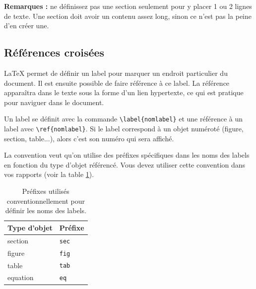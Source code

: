 \documentclass{ASD}
\begin{document}
\textbf{Remarques :} ne définissez pas une section seulement pour y placer 1 ou 2 lignes de texte. Une section doit avoir un contenu assez long, sinon ce n'est pas la peine d'en créer une.
	
\subsection{Références croisées}
\label{sec:references}
\LaTeX{} permet de définir un label pour marquer un endroit particulier du document. Il est ensuite possible de faire référence à ce label. La référence apparaîtra dans le texte sous la forme d'un lien hypertexte, ce qui est pratique pour naviguer dans le document. 
	
Un label se définit avec la commande \texttt{\textbackslash{}label\{nomlabel\}} et une référence à un label avec \texttt{\textbackslash{}ref\{nomlabel\}}. Si le label correspond à un objet numéroté (figure, section, table...), alors c'est son numéro qui sera affiché.
	
La convention veut qu'on utilise des préfixes spécifiques dans les noms des labels en fonction du type d'objet référencé. Vous devez utiliser cette convention dans vos rapports (voir la table \ref{tab:prefixes}).
	
\begin{table}[htb]
	\centering
	\begin{tabular}{l l}
		\hline
		\rowcolor{DarkColor} 
		\textbf{Type d'objet}	& \textbf{Préfixe}	\\
		\hline
		section					& \texttt{sec}	\\
		figure 					& \texttt{fig}	\\
		table 					& \texttt{tab}	\\
		equation 				& \texttt{eq}	\\
		\hline
	\end{tabular}
	\caption{Préfixes utilisés conventionnellement pour définir les noms des labels.}
	\label{tab:prefixes}
\end{table}
	
\end{document}
